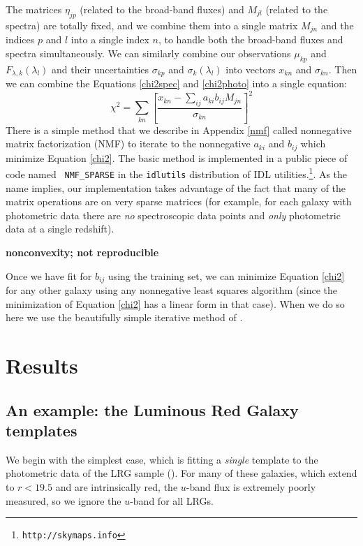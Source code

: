 \documentclass[10pt,preprint]{aastex}
\begin{document}
The matrices $\eta_{jp}$ (related to the broad-band fluxes) and
$M_{jl}$ (related to the spectra) are totally fixed, and we combine
them into a single matrix $M_{jn}$ and the indices $p$ and $l$ into a
single index $n$, to handle both the broad-band fluxes and spectra
simultaneously. We can similarly combine our observations $\mu_{kp}$
and $F_{\lambda, k}(\lambda_l)$ and their uncertainties $\sigma_{kp}$
and $\sigma_{k}(\lambda_l)$ into vectors $x_{kn}$ and $\sigma_{kn}$.
Then we can combine the Equations \ref{chi2spec} and
\ref{chi2photo} into a single equation:
\begin{equation}
\label{chi2}
\chi^2 = \sum_{kn} \left[ 
\frac{x_{kn} - \sum_{ij} a_{ki} b_{ij} M_{jn}}
{\sigma_{kn}} \right]^2
\end{equation}
There is a simple method that we describe in Appendix \ref{nmf} called
nonnegative matrix factorization (NMF) to iterate to the nonnegative
$a_{ki}$ and $b_{ij}$ which minimize Equation \ref{chi2}. The basic
method is implemented in a public piece of code named {\tt
NMF\_SPARSE} in the {\tt idlutils} distribution of IDL
utilities.\footnote{\tt http://skymaps.info}. As the name implies, our
implementation takes advantage of the fact that many of the matrix
operations are on very sparse matrices (for example, for each galaxy
with photometric data there are {\it no} spectroscopic data points and
{\it only} photometric data at a single redshift).

{\bf nonconvexity; not reproducible}

Once we have fit for $b_{ij}$ using the training set, we can minimize
Equation \ref{chi2} for any other galaxy using any nonnegative least
squares algorithm (since the minimization of Equation \ref{chi2} has a
linear form in that case).  When we do so here we use the beautifully
simple iterative method of \citet{sha02a}.

\section{Results}
\label{results}

\subsection{An example: the Luminous Red Galaxy templates}

We begin with the simplest case, which is fitting a {\it single}
template to the photometric data of the LRG sample
(\citealt{eisenstein01a}). For many of these galaxies, which extend to
$r<19.5$ and are intrinsically red, the $u$-band flux is extremely
poorly measured, so we ignore the $u$-band for all LRGs. 
\end{document}
